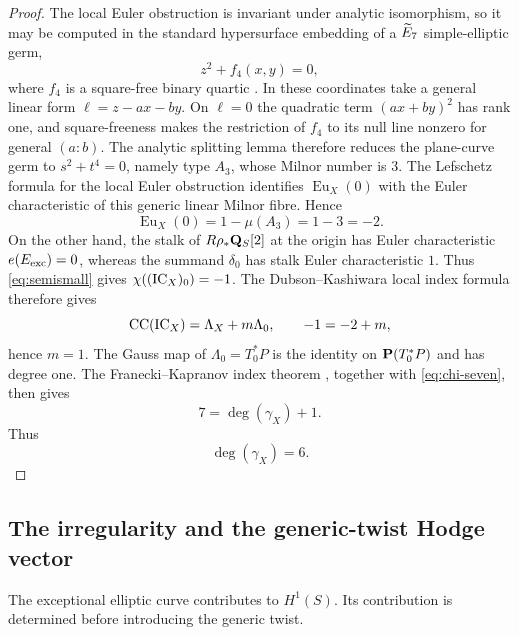 \begin{proof}
The local Euler obstruction is invariant under analytic isomorphism, so it
may be computed in the standard hypersurface embedding of a $\widetilde E_7$
simple-elliptic germ,
\[
 z^2+f_4(x,y)=0,
\]
where $f_4$ is a square-free binary quartic
\cite{Laufer1977,Pinkham1977}.  In these coordinates take a general linear
form $\ell=z-ax-by$.  On $\ell=0$ the quadratic term $(ax+by)^2$ has rank
one, and square-freeness makes the restriction of $f_4$ to its null line
nonzero for general $(a:b)$.  The analytic splitting lemma therefore
reduces the plane-curve germ to $s^2+t^4=0$, namely type $A_3$, whose Milnor
number is $3$.
The Lefschetz formula for the local Euler obstruction
\cite[Theorem~3.1]{BrasseletLeSeade2000} identifies $\operatorname{Eu}_X(0)$
with the Euler characteristic of this generic linear Milnor fibre.  Hence
\[
 \operatorname{Eu}_X(0)=1-\mu(A_3)=1-3=-2.
\]
On the other hand, the stalk of $R\rho_*\mathbf Q_S[2]$ at the origin has
Euler characteristic $e(E_{\mathrm{exc}})=0$, whereas the summand $\delta_0$ has
stalk Euler characteristic $1$.  Thus \eqref{eq:semismall} gives
$\chi((\operatorname{IC}_X)_0)=-1$.  The Dubson--Kashiwara local index formula
\cite{Kashiwara1985} therefore gives
\[
 \operatorname{CC}(\operatorname{IC}_X)=\Lambda_X+m\Lambda_0,
 \qquad -1=-2+m,
\]
hence $m=1$.  The Gauss map of $\Lambda_0=T_0^*P$ is the identity on
$\mathbf P(T_0^*P)$ and has degree one.  The Franecki--Kapranov index theorem
\cite[Theorem~1.3]{FraneckiKapranov2000}, together with
\eqref{eq:chi-seven}, then gives
\[
 7=\deg(\gamma_X)+1.
\]
Thus
\begin{equation}
 \deg(\gamma_X)=6.
\label{eq:gauss-degree}
\end{equation}
\end{proof}

\subsection{The irregularity and the generic-twist Hodge vector}

The exceptional elliptic curve contributes to $H^1(S)$.  Its contribution is
determined before introducing the generic twist.



